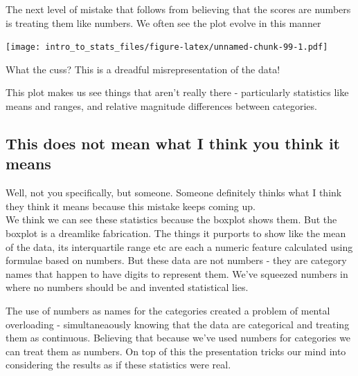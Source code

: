 \documentclass[
]{book}
\newenvironment{Shaded}{\begin{snugshade}}{\end{snugshade}}
\newcommand{\DataTypeTok}[1]{\textcolor[rgb]{0.13,0.29,0.53}{#1}}
\newcommand{\KeywordTok}[1]{\textcolor[rgb]{0.13,0.29,0.53}{\textbf{#1}}}
\newcommand{\NormalTok}[1]{#1}
\newcommand{\OperatorTok}[1]{\textcolor[rgb]{0.81,0.36,0.00}{\textbf{#1}}}
\newcommand{\StringTok}[1]{\textcolor[rgb]{0.31,0.60,0.02}{#1}}
\begin{document}
The next level of mistake that follows from believing that the scores are numbers is treating them like numbers. We often see the plot evolve in this manner

\begin{Shaded}
\end{Shaded}

\texttt{[image: intro\_to\_stats\_files/figure-latex/unnamed-chunk-99-1.pdf]}

What the cuss? This is a dreadful misrepresentation of the data!

This plot makes us see things that aren't really there - particularly statistics like means and ranges, and relative magnitude differences between categories.

\hypertarget{this-does-not-mean-what-i-think-you-think-it-means}{%
\subsection{This does not mean what I think you think it means}\label{this-does-not-mean-what-i-think-you-think-it-means}}

Well, not you specifically, but someone. Someone definitely thinks what I think they think it means because this mistake keeps coming up.\\
We think we can see these statistics because the boxplot shows them. But the boxplot is a dreamlike fabrication. The things it purports to show like the mean of the data, its interquartile range etc are each a numeric feature calculated using formulae based on numbers. But these data are not numbers - they are category names that happen to have digits to represent them. We've squeezed numbers in where no numbers should be and invented statistical lies.

The use of numbers as names for the categories created a problem of mental overloading - simultaneaously knowing that the data are categorical and treating them as continuous. Believing that because we've used numbers for categories we can treat them as numbers. On top of this the presentation tricks our mind into considering the results as if these statistics were real.
\end{document}
